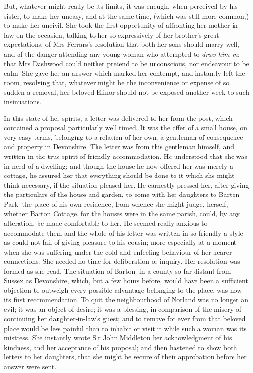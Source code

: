 But, whatever might really be its limits, it was enough, when perceived by his sister, to make her uneasy, and at the same time, (which was still more common,) to make her uncivil. She took the first opportunity of affronting her mother-in-law on the occasion, talking to her so expressively of her brother's great expectations, of Mrs Ferrars's resolution that both her sons should marry well, and of the danger attending any young woman who attempted to \textit{draw him in}; that Mrs Dashwood could neither pretend to be unconscious, nor endeavour to be calm. She gave her an answer which marked her contempt, and instantly left the room, resolving that, whatever might be the inconvenience or expense of so sudden a removal, her beloved Elinor should not be exposed another week to such insinuations.

In this state of her spirits, a letter was delivered to her from the post, which contained a proposal particularly well timed. It was the offer of a small house, on very easy terms, belonging to a relation of her own, a gentleman of consequence and property in Devonshire. The letter was from this gentleman himself, and written in the true spirit of friendly accommodation. He understood that she was in need of a dwelling; and though the house he now offered her was merely a cottage, he assured her that everything should be done to it which she might think necessary, if the situation pleased her. He earnestly pressed her, after giving the particulars of the house and garden, to come with her daughters to Barton Park, the place of his own residence, from whence she might judge, herself, whether Barton Cottage, for the houses were in the same parish, could, by any alteration, be made comfortable to her. He seemed really anxious to accommodate them and the whole of his letter was written in so friendly a style as could not fail of giving pleasure to his cousin; more especially at a moment when she was suffering under the cold and unfeeling behaviour of her nearer connections. She needed no time for deliberation or inquiry. Her resolution was formed as she read. The situation of Barton, in a county so far distant from Sussex as Devonshire, which, but a few hours before, would have been a sufficient objection to outweigh every possible advantage belonging to the place, was now its first recommendation. To quit the neighbourhood of Norland was no longer an evil; it was an object of desire; it was a blessing, in comparison of the misery of continuing her daughter-in-law's guest; and to remove for ever from that beloved place would be less painful than to inhabit or visit it while such a woman was its mistress. She instantly wrote Sir John Middleton her acknowledgment of his kindness, and her acceptance of his proposal; and then hastened to show both letters to her daughters, that she might be secure of their approbation before her answer were sent.

